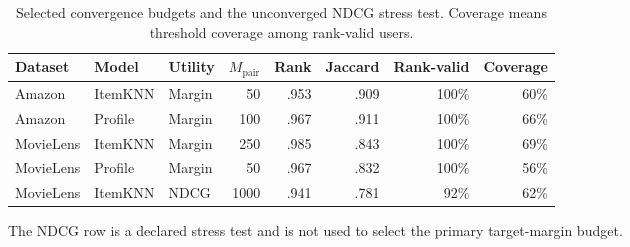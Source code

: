 \begin{table}[ht]
\centering\scriptsize
\caption{Selected convergence budgets and the unconverged NDCG stress test. Coverage means threshold coverage among rank-valid users.}
\label{tab:app-convergence}
\begin{tabular}{@{}lllrrrrr@{}}
\toprule
Dataset & Model & Utility & $M_{\mathrm{pair}}$ & Rank & Jaccard & Rank-valid & Coverage \\
\midrule
Amazon & ItemKNN & Margin & 50 & .953 & .909 & 100\% & 60\% \\
Amazon & Profile & Margin & 100 & .967 & .911 & 100\% & 66\% \\
MovieLens & ItemKNN & Margin & 250 & .985 & .843 & 100\% & 69\% \\
MovieLens & Profile & Margin & 50 & .967 & .832 & 100\% & 56\% \\
MovieLens & ItemKNN & NDCG & 1000 & .941 & .781 & 92\% & 62\% \\
\bottomrule
\end{tabular}
\end{table}

\noindent The NDCG row is a declared stress test and is not used to select the primary target-margin budget.
